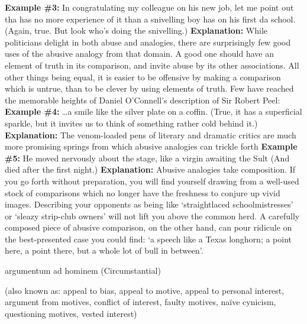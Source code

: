 \documentclass[a4paper,12pt,single,pdftex]{scrartcl}
\begin{document}
 \newline
{\bf Example \#3:} \newline
In congratulating my colleague on his new job, let me point out tha has no more experience of it than a snivelling boy has on his first da school. \newline
 \newline
(Again, true. But look who’s doing the snivelling.) \newline
 \newline
{\bf Explanation:} While politicians delight in both abuse and analogies, there are surprisingly few good uses of the abusive analogy from that domain. A good one should have an element of truth in its comparison, and invite abuse by its other associations. All other things being equal, it is easier to be offensive by making a comparison which is untrue, than to be clever by using elements of truth. Few have reached the memorable heights of Daniel O’Connell’s description of Sir Robert Peel: \newline
 \newline
{\bf Example \#4:} \newline
…a smile like the silver plate on a coffin. \newline
 \newline
(True, it has a superficial sparkle, but it invites us to think of something rather cold behind it.) \newline
 \newline
{\bf Explanation:}  The venom-loaded pens of literary and dramatic critics are much more promising springs from which abusive analogies can trickle forth {\bf Example \#5:} He moved nervously about the stage, like a virgin awaiting the Sult (And died after the first night.) {\bf Explanation:} Abusive analogies take composition. If you go forth without preparation, you will find yourself drawing from a well-used stock of comparisons which no longer have the freshness to conjure up vivid images. Describing your opponents as being like ‘straightlaced schoolmistresses’ or ‘sleazy strip-club owners’ will not lift you above the common herd. A carefully composed piece of abusive comparison, on the other hand, can pour ridicule on the best-presented case you could find: ‘a speech like a Texas longhorn; a point here, a point there, but a whole lot of bull in between’.
  

argumentum ad hominem (Circumstantial)
    
      (also known as: appeal to bias, appeal to motive, appeal to personal interest, argument from motives, conflict of interest, faulty motives, naïve cynicism, questioning motives, vested interest)
    \\
\end{document}
